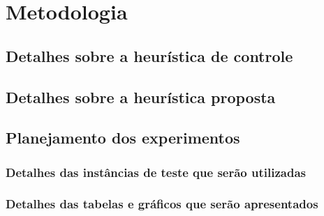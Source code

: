 \section{Metodologia}
\subsection{Detalhes sobre a heurística de controle}
\subsection{Detalhes sobre a heurística proposta}
\subsection{Planejamento dos experimentos}
\subsubsection{Detalhes das instâncias de teste que serão utilizadas}
\subsubsection{Detalhes das tabelas e gráficos que serão apresentados}